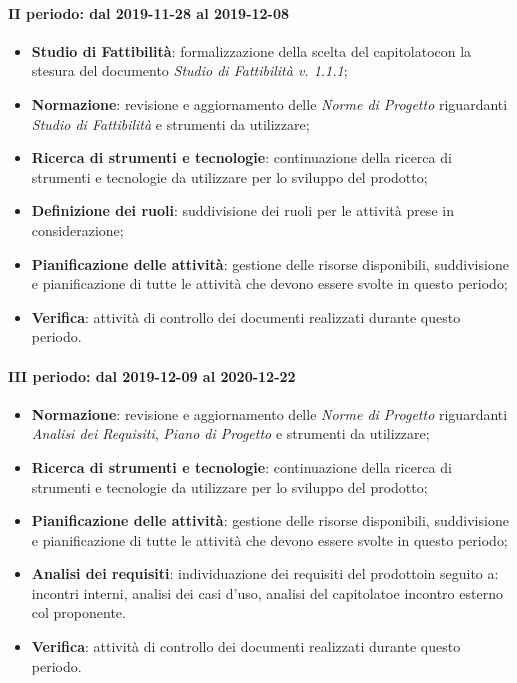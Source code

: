 \paragraph*{II periodo: dal 2019-11-28 al 2019-12-08}
\begin{itemize}
	\item \textbf{Studio di Fattibilità}: formalizzazione della scelta del capitolato\glosp con la stesura del documento \textit{Studio di Fattibilità v. 1.1.1};
	\item \textbf{Normazione}: revisione e aggiornamento delle \textit{Norme di Progetto} riguardanti \textit{Studio di Fattibilità} e strumenti da utilizzare;
	\item \textbf{Ricerca di strumenti e tecnologie}: continuazione della ricerca di strumenti e tecnologie da utilizzare per lo sviluppo del prodotto\glo;
	\item \textbf{Definizione dei ruoli}: suddivisione dei ruoli per le attività prese in considerazione; 
	\item \textbf{Pianificazione delle attività}: gestione delle risorse disponibili, suddivisione e pianificazione di tutte le attività che devono essere svolte in questo periodo;
	\item \textbf{Verifica}: attività di controllo dei documenti realizzati durante questo periodo.
\end{itemize}

\paragraph*{III periodo: dal 2019-12-09 al 2020-12-22}
\begin{itemize}
	\item \textbf{Normazione}: revisione e aggiornamento delle \textit{Norme di Progetto} riguardanti \textit{Analisi dei Requisiti}, \textit{Piano di Progetto} e strumenti da utilizzare;
	\item \textbf{Ricerca di strumenti e tecnologie}: continuazione della ricerca di strumenti e tecnologie da utilizzare per lo sviluppo del prodotto\glo;
	\item \textbf{Pianificazione delle attività}: gestione delle risorse disponibili, suddivisione e pianificazione di tutte le attività che devono essere svolte in questo periodo;
	\item \textbf{Analisi dei requisiti}: individuazione dei requisiti del prodotto\glosp in seguito a: incontri interni, analisi dei casi d'uso\glo, analisi del capitolato\glosp e incontro esterno col proponente.
	\item \textbf{Verifica}: attività di controllo dei documenti realizzati durante questo periodo.
\end{itemize}

